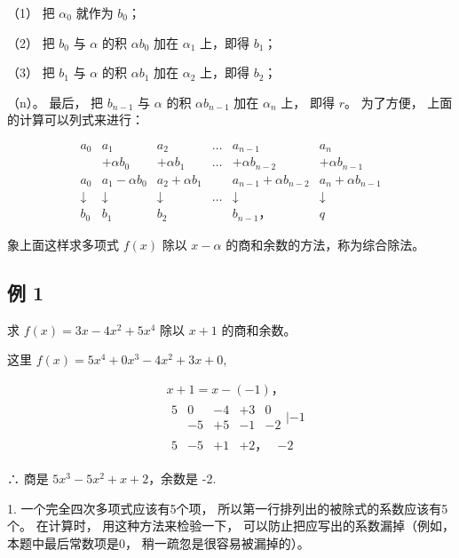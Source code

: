 （1） 把 \(\alpha_{0}\) 就作为 \(b_{0}\)；

（2） 把 \(b_{0}\) 与 \(\alpha\) 的积 \(\alpha b_{0}\) 加在
\(\alpha_{1}\) 上，即得 \(b_{1}\)；

（3） 把 \(b_{1}\) 与 \(\alpha\) 的积 \(\alpha b_{1}\) 加在
\(\alpha_{2}\) 上，即得 \(b_{2}\)；

（n）。 最后， 把 \(b_{n-1}\) 与 \(\alpha\) 的积 \(\alpha b_{n-1}\) 加在
\(\alpha_{n}\) 上， 即得 \(r\)。 为了方便， 上面的计算可以列式来进行：

\[
\begin{array}{cccccc} a _ {0} & a _ {1} & a _ {2} & \dots & a _ {n - 1} & a _ {n} \\ & + \alpha b _ {0} & + \alpha b _ {1} & \dots & + \alpha b _ {n - 2} & + \alpha b _ {n - 1} \\ \hline a _ {0} & a _ {1} - \alpha b _ {0} & a _ {2} + \alpha b _ {1} & & a _ {n - 1} + \alpha b _ {n - 2} & a _ {n} + \alpha b _ {n - 1} \\ \downarrow & \downarrow & \downarrow & \dots & \downarrow & \downarrow \\ b _ {0} & b _ {1} & b _ {2} & & b _ {n - 1}\text{，} & q \end{array}
\]

象上面这样求多项式 \(f(x)\) 除以 \(x - \alpha\)
的商和余数的方法，称为综合除法。

\subsection{例 1}

求 \(f(x) = 3x - 4x^2 + 5x^4\) 除以 \(x + 1\) 的商和余数。

 这里 \(f(x) = 5x^{4} + 0x^{3} - 4x^{2} + 3x + 0,\)

\[
\begin{array}{rl} & x + 1 = x - (- 1)\text{，} \\ & \begin{array}{ccccc} 5 & 0 & - 4 & + 3 & 0 \\ & - 5 & + 5 & - 1 & - 2 \end{array} \left| - 1 \right. \\ & \begin{array}{ccccc} 5 & - 5 & + 1 & + 2\text{，} & - 2 \end{array} \end{array}
\]

∴ 商是 \(5x^{3}-5x^{2}+x+2\)，余数是 -2.

 1. 一个完全四次多项式应该有5个项，
所以第一行排列出的被除式的系数应该有5个。 在计算时，
用这种方法来检验一下， 可以防止把应写出的系数漏掉（例如，
本题中最后常数项是0， 稍一疏忽是很容易被漏掉的）。

